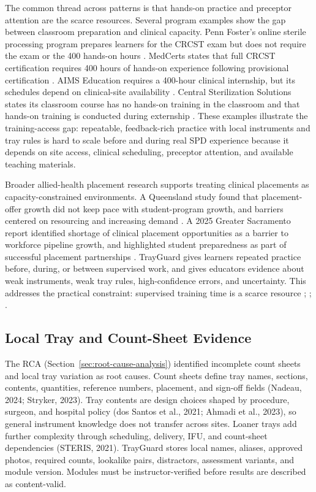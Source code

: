 \documentclass[10pt,a4paper]{article}
\begin{document}
The common thread across patterns is that hands-on practice and preceptor attention are the scarce resources. Several program examples show the gap between classroom preparation and clinical capacity. Penn Foster's online sterile processing program prepares learners for the CRCST exam but does not require the exam or the 400 hands-on hours \cite{penn-foster-sterile-processing-accessed-2026}. MedCerts states that full CRCST certification requires 400 hours of hands-on experience following provisional certification \cite{medcerts-catalog-2025}. AIMS Education requires a 400-hour clinical internship, but its schedules depend on clinical-site availability \cite{aims-education-sterile-processing-accessed-2026}. Central Sterilization Solutions states its classroom course has no hands-on training in the classroom and that hands-on training is conducted during externship \cite{central-sterilization-solutions-in-person-accessed-2026}. These examples illustrate the training-access gap: repeatable, feedback-rich practice with local instruments and tray rules is hard to scale before and during real SPD experience because it depends on site access, clinical scheduling, preceptor attention, and available teaching materials.

Broader allied-health placement research supports treating clinical placements as capacity-constrained environments. A Queensland study found that placement-offer growth did not keep pace with student-program growth, and barriers centered on resourcing and increasing demand \cite{mcbride-et-al-2020}. A 2025 Greater Sacramento report identified shortage of clinical placement opportunities as a barrier to workforce pipeline growth, and highlighted student preparedness as part of successful placement partnerships \cite{north-greater-sacramento-coe-2025}. TrayGuard gives learners repeated practice before, during, or between supervised work, and gives educators evidence about weak instruments, weak tray rules, high-confidence errors, and uncertainty. This addresses the practical constraint: supervised training time is a scarce resource \cite{aorn-staffing-shortage-2025}; \cite{brozak-2025}; \cite{macola-et-al-2025}.
\subsection{Local Tray and Count-Sheet Evidence}


The RCA (Section~\ref{sec:root-cause-analysis}) identified incomplete count sheets and local tray variation as root causes. Count sheets define tray names, sections, contents, quantities, reference numbers, placement, and sign-off fields (Nadeau, 2024; Stryker, 2023). Tray contents are design choices shaped by procedure, surgeon, and hospital policy (dos Santos et al., 2021; Ahmadi et al., 2023), so general instrument knowledge does not transfer across sites. Loaner trays add further complexity through scheduling, delivery, IFU, and count-sheet dependencies (STERIS, 2021). TrayGuard stores local names, aliases, approved photos, required counts, lookalike pairs, distractors, assessment variants, and module version. Modules must be instructor-verified before results are described as content-valid.
\end{document}
